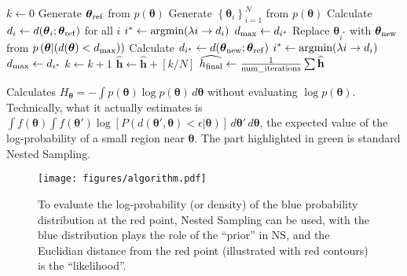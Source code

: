 \documentclass[entropy,article,accept,oneauthor,pdftex,10pt,a4paper]{mdpi}
\newcommand{\x}{\boldsymbol{\theta}}
\begin{document}
\begin{algorithm}
\begin{algorithmic}
    \State $k \leftarrow 0$
    \State Generate $\x_{\rm ref}$ from $p(\x)$
\color{green}
    \State Generate $\left\{\x_i\right\}_{i=1}^N$ from $p(\x)$
    \State Calculate $d_i \leftarrow d(\x_i; \x_{\rm ref})$ for all $i$
    \State $i^* \leftarrow \textnormal{argmin}(\lambda i \rightarrow d_i)$
    \State $d_{\rm max} \leftarrow d_{i^*}$
        \State Replace $\x_{i^*}$ with $\x_{\rm new}$ from
               $p\left(\x | (d(\x) < d_{\rm max})\right)$
        \State Calculate $d_{i^*} \leftarrow d(\x_{\rm new}; \x_{\rm ref})$
        \State $i^* \leftarrow \textnormal{argmin}(\lambda i \rightarrow d_i)$
        \State $d_{\rm max} \leftarrow d_{i^*}$
        \State $k \leftarrow k+1$
    \EndWhile
\color{black}
    \State $\widehat{\mathbf{h}} \leftarrow \widehat{\mathbf{h}} + [k/N]$
\EndWhile
\State $\widehat{h_{\rm final}} \leftarrow \frac{1}{\rm num\_iterations} \sum \widehat{\mathbf{h}}$
\end{algorithmic}
\caption{Calculates $H_{\x} = -\int p(\x) \log p(\x) \, d\x$
         without evaluating $\log p(\x)$. Technically, what it actually
         estimates is $\int f(\x) \int f(\x')
            \log \left[ P(d(\x', \x) < \epsilon | \x) \right]
                        \, d\x' \, d\x$, the expected value of the
         log-probability of a small region near $\x$.
        The part highlighted in green is standard Nested Sampling.
        \label{alg:algorithm}}
\end{algorithm}

\begin{figure}[!ht]
\centering
\texttt{[image: figures/algorithm.pdf]}
\caption{To evaluate the log-probability (or density) of the blue
probability distribution at the red point, Nested Sampling can be used,
with the blue distribution plays the role of the ``prior'' in NS, and the
Euclidian distance from the red point (illustrated with red contours)
is the ``likelihood''.\label{fig:algorithm}}
\end{figure}
\end{document}
